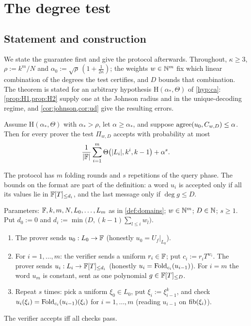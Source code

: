 \section{The degree test}\label{sec:test}

\subsection{Statement and construction}\label{sec:statement}

We state the guarantee first and give the protocol afterwards. Throughout, $\kappa\ge3$,
$\rho:=k^m/N$ and $\alpha_0:=\sqrt\rho\,(1+\frac1{2\kappa})$; the weights $w\in\mathbb{N}^m$ fix which
linear combination of the degrees the test certifies, and $D$ bounds that combination. The theorem is
stated for an arbitrary hypothesis $\mathrm H(\alpha_*,\Theta)$ of \cref{hyp:ca}:
\cref{prop:H1,prop:H2} supply one at the Johnson radius and in the unique-decoding regime, and
\cref{cor:johnson,cor:ud} give the resulting errors.

\begin{theorem}\label{thm:main}
Assume $\mathrm H(\alpha_*,\Theta)$ with $\alpha_*>\rho$, let $\alpha\ge\alpha_*$, and suppose
$\mathrm{agree}(u_0,C_{w,D})\le\alpha$. Then for every prover the test $\Pi_{w,D}$ accepts with
probability at most
\[
\frac1{|\mathbb{F}|}\sum_{i=1}^{m}\Theta\big(|L_i|,k^i,k-1\big)+\alpha^s .
\]
\end{theorem}

The protocol has $m$ folding rounds and $s$ repetitions of the query phase. The bounds on the
format are part of the definition: a word $u_i$ is accepted only if all its values lie in
$\mathbb{F}[T]_{\le d_i}$, and the last message only if $\deg g\le D$.

\begin{construction}\label{def:protocol}
Parameters: $\mathbb{F},k,m,N,L_0,\dots,L_m$ as in \cref{def:domains}; $w\in\mathbb{N}^m$; $D\in\mathbb{N}$; $s\ge1$.
Put $d_0:=0$ and $d_i:=\min\big(D,(k-1)\sum_{l\le i}w_l\big)$.
\begin{enumerate}
\item The prover sends $u_0:L_0\to\mathbb{F}$ (honestly $u_0=U_f|_{L_0}$).
\item For $i=1,\dots,m$: the verifier sends a uniform $r_i\in\mathbb{F}$; put $c_i:=r_iT^{w_i}$. The
prover sends $u_i:L_i\to\mathbb{F}[T]_{\le d_i}$ (honestly $u_i=\mathrm{Fold}_{c_i}(u_{i-1})$). For $i=m$ the
word $u_m$ is constant, sent as one polynomial $g\in\mathbb{F}[T]_{\le D}$.
\item Repeat $s$ times: pick a uniform $\xi_0\in L_0$, put $\xi_i:=\xi_{i-1}^k$, and check
$u_i(\xi_i)=\mathrm{Fold}_{c_i}(u_{i-1})(\xi_i)$ for $i=1,\dots,m$ (reading $u_{i-1}$ on $\mathrm{fib}(\xi_i)$).
\end{enumerate}
The verifier accepts iff all checks pass.
\end{construction}

